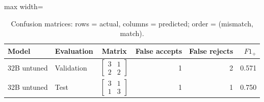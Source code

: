 \begin{table}[htbp]
\centering
\caption{Confusion matrices: rows = actual, columns = predicted; order = (mismatch, match).}
\label{tab:pilot32-confusion}
\small
\begin{adjustbox}{max width=\textwidth}
\begin{tabular}{llcrrr}
\toprule
Model & Evaluation & Matrix & False accepts & False rejects & $F1_+$ \\
\midrule
32B untuned & Validation & $\left[\begin{array}{rr}3&1\\2&2\end{array}\right]$ & 1 & 2 & 0.571 \\
32B untuned & Test & $\left[\begin{array}{rr}3&1\\1&3\end{array}\right]$ & 1 & 1 & 0.750 \\
\bottomrule
\end{tabular}
\end{adjustbox}
\end{table}
